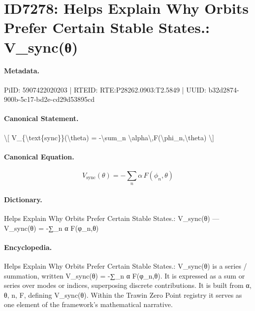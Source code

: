 \section*{ID7278: Helps Explain Why Orbits Prefer Certain Stable States.: V\_sync(θ)}
\paragraph{Metadata.}
PiID: 5907422020203 | RTEID: RTE:P28262.0903:T2.5849 | UUID: b32d2874-900b-5c17-bd2e-cd29d53895cd

\paragraph{Canonical Statement.}
\textbackslash{}[ V\_\{\textbackslash{}text\{sync\}\}(\textbackslash{}theta) = -\textbackslash{}sum\_n \textbackslash{}alpha\textbackslash{},F(\textbackslash{}phi\_n,\textbackslash{}theta) \textbackslash{}]

\paragraph{Canonical Equation.}
\[
V_{\text{sync}}(\theta) = -\sum_n \alpha\,F(\phi_n,\theta)
\]

\paragraph{Dictionary.}
Helps Explain Why Orbits Prefer Certain Stable States.: V\_sync(θ) — V\_sync(θ) = -∑\_n α F(φ\_n,θ)

\paragraph{Encyclopedia.}
Helps Explain Why Orbits Prefer Certain Stable States.: V\_sync(θ) is a series / summation, written V\_sync(θ) = -∑\_n α F(φ\_n,θ). It is expressed as a sum or series over modes or indices, superposing discrete contributions. It is built from α, θ, n, F, defining V\_sync(θ). Within the Trawin Zero Point registry it serves as one element of the framework's mathematical narrative.
